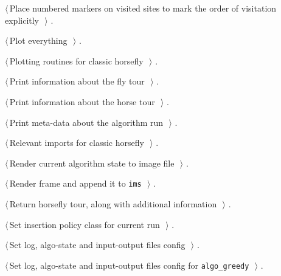 \documentclass[11.5pt]{report}
\begin{document}
{\begin{list}{}{\setlength{\itemsep}{-\parsep}\setlength{\itemindent}{-\leftmargin}}
\item $\langle\,$Place numbered markers on visited sites to mark the order of visitation explicitly\nobreak\ {\footnotesize {}}$\,\rangle$ {\footnotesize {\NWtxtRefIn} .}
\item $\langle\,$Plot everything\nobreak\ {\footnotesize {}}$\,\rangle$ {\footnotesize {\NWtxtRefIn} .}
\item $\langle\,$Plotting routines for classic horsefly\nobreak\ {\footnotesize {}}$\,\rangle$ {\footnotesize {\NWtxtRefIn} .}
\item $\langle\,$Print information about the fly tour\nobreak\ {\footnotesize {}}$\,\rangle$ {\footnotesize {\NWtxtRefIn} .}
\item $\langle\,$Print information about the horse tour\nobreak\ {\footnotesize {}}$\,\rangle$ {\footnotesize {\NWtxtRefIn} .}
\item $\langle\,$Print meta-data about the algorithm run\nobreak\ {\footnotesize {}}$\,\rangle$ {\footnotesize {\NWtxtRefIn} .}
\item $\langle\,$Relevant imports for classic horsefly\nobreak\ {\footnotesize {}}$\,\rangle$ {\footnotesize {\NWtxtRefIn} .}
\item $\langle\,$Render current algorithm state to image file\nobreak\ {\footnotesize {}}$\,\rangle$ {\footnotesize {\NWtxtRefIn} .}
\item $\langle\,$Render frame and append it to \verb|ims|\nobreak\ {\footnotesize {}}$\,\rangle$ {\footnotesize {\NWtxtRefIn} .}
\item $\langle\,$Return horsefly tour, along with additional information\nobreak\ {\footnotesize {}}$\,\rangle$ {\footnotesize {\NWtxtRefIn} .}
\item $\langle\,$Set insertion policy class for current run\nobreak\ {\footnotesize {}}$\,\rangle$ {\footnotesize {\NWtxtRefIn} .}
\item $\langle\,$Set log, algo-state and input-output files config\nobreak\ {\footnotesize {}}$\,\rangle$ {\footnotesize {\NWtxtRefIn} .}
\item $\langle\,$Set log, algo-state and input-output files config for \verb|algo_greedy|\nobreak\ {\footnotesize {}}$\,\rangle$ {\footnotesize {\NWtxtRefIn} .}

\end{list}}
\end{document}
